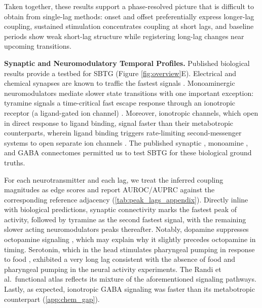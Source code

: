 \documentclass{article}
\theoremstyle{plain}
\theoremstyle{definition}
\theoremstyle{remark}
\newcommand{\1}{\mathbf{1}}
\begin{document}
Taken together, these results support a phase-resolved picture that is difficult to obtain from single-lag methods: onset and offset preferentially express longer-lag coupling, sustained stimulation concentrates coupling at short lags, and baseline periods show weak short-lag structure while registering long-lag changes near upcoming transitions. %


\textbf{Synaptic and Neuromodulatory Temporal Profiles.} Published biological results provide a testbed for SBTG (Figure \ref{fig:overview}E). Electrical and chemical synapses are known to traffic the fastest signals \cite{bargmann2012beyond, bargmann2013connectome}. Monoaminergic neuromodulators mediate slower state transitions with one important exception: tyramine signals a time-critical fast escape response through an ionotropic receptor (a ligand-gated ion channel) \cite{pirri2009tyramine}. Moreover, ionotropic channels, which open in direct response to ligand binding, signal faster than their metabotropic counterparts, wherein ligand binding triggers rate-limiting second-messenger systems to open separate ion channels \cite{hobert2013neuronal}. The published synaptic \cite{Cook2019}, monoamine \cite{bentley2016multilayer}, and GABA \cite{Yemini2021} connectomes permitted us to test SBTG for these biological ground truths.

For each neurotransmitter and each lag, we treat the inferred coupling magnitudes as edge scores and report AUROC/AUPRC against the corresponding reference adjacency (\cref{tab:peak_lags_appendix}). Directly inline with biological predictions, synaptic connectivity marks the fastest peak of activity, followed by tyramine as the second fastest signal, with the remaining slower acting neuromodulators peaks thereafter. Notably, dopamine suppresses octopamine signaling \cite{suo2009dopamine}, which may explain why it slightly precedes octopamine in timing. Serotonin, which in the head stimulates pharyngeal pumping in response to food \cite{avery1990effects, dag2023dissecting}, exhibited a very long lag consistent with the absence of food and pharyngeal pumping in the neural activity experiments. The Randi et al.\ functional atlas reflects its mixture of the aforementioned signaling pathways. Lastly, as expected, ionotropic GABA signaling was faster than its metabotropic counterpart (\cref{app:chem_gap}).
\end{document}
